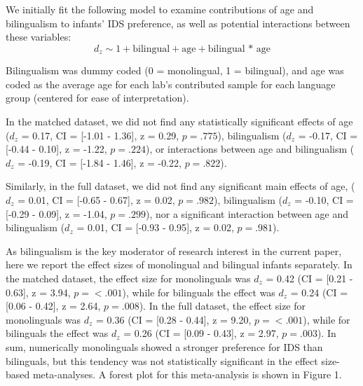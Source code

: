 \documentclass[english,,man,floatsintext]{apa6}
\begin{document}
We initially fit the following model to examine contributions of age and bilingualism to infants' IDS preference, as well as potential interactions between these variables: \[d_z \sim 1 + \text{bilingual} + \text{age} + \text{bilingual * age}\]

Bilingualism was dummy coded (0 = monolingual, 1 = bilingual), and age was coded as the average age for each lab's contributed sample for each language group (centered for ease of interpretation).

In the matched dataset, we did not find any statistically significant effects of age (\(d_z\) = 0.17, CI = {[}-1.01 - 1.36{]}, z = 0.29, \(p = .775\)), bilingualism (\(d_z\) =
-0.17, CI = {[}-0.44 - 0.10{]}, z = -1.22, \(p = .224\)), or interactions between age and bilingualism (\(d_z\) = -0.19, CI = {[}-1.84 - 1.46{]}, z = -0.22, \(p = .822\)).

Similarly, in the full dataset, we did not find any significant main effects of age, (\(d_z\) = 0.01, CI = {[}-0.65 - 0.67{]}, z = 0.02, \(p = .982\)),
bilingualism (\(d_z\) = -0.10, CI = {[}-0.29 - 0.09{]}, z = -1.04, \(p = .299\)), nor a significant interaction between age and bilingualism (\(d_z\) = 0.01, CI = {[}-0.93 - 0.95{]}, z = 0.02, \(p = .981\)).

As bilingualism is the key moderator of research interest in the current paper, here we report the effect sizes of monolingual and bilingual infants separately. In the matched dataset, the effect size for monolinguals was \(d_z\) = 0.42 (CI = {[}0.21 - 0.63{]}, z = 3.94, \(p = < .001\)), while for bilinguals the effect was \(d_z\) = 0.24 (CI = {[}0.06 - 0.42{]}, z = 2.64, \(p = .008\)). In the full dataset, the effect size for monolinguals was \(d_z\) = 0.36 (CI = {[}0.28 - 0.44{]}, z = 9.20, \(p = < .001\)), while for bilinguals the effect was \(d_z\) = 0.26 (CI = {[}0.09 - 0.43{]}, z = 2.97, \(p = .003\)). In sum, numerically monolinguals showed a stronger preference for IDS than bilinguals, but this tendency was not statistically significant in the effect size-based meta-analyses. A forest plot for this meta-analysis is shown in Figure 1.
\end{document}
